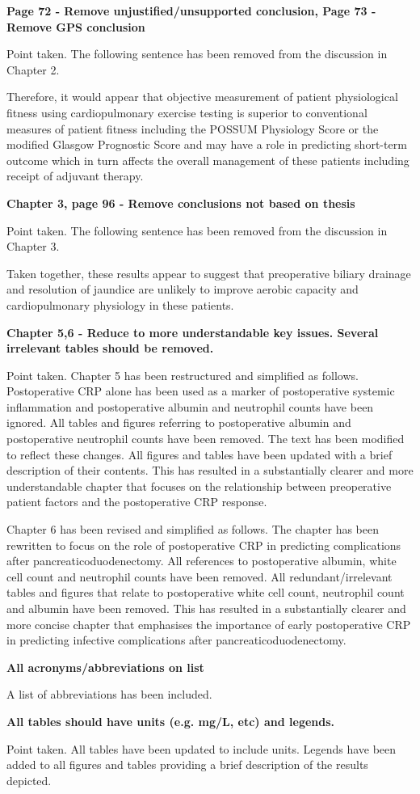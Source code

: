 \documentclass[12pt,a4paper]{article}
\begin{document}
\textbf{Page 72 - Remove unjustified/unsupported conclusion, Page 73 - Remove GPS conclusion}
	
	Point taken. The following sentence has been removed from the discussion in Chapter 2.
	
	Therefore, it would appear that objective measurement of patient physiological fitness using cardiopulmonary exercise testing is superior to conventional measures of patient fitness including the POSSUM Physiology Score or the modified Glasgow Prognostic Score and may have a role in predicting short-term outcome which in turn affects the overall management of these patients including receipt of adjuvant therapy.
	
\textbf{Chapter 3, page 96 - Remove conclusions not based on thesis}
	
	Point taken. The following sentence has been removed from the discussion in Chapter 3.
	
	Taken together, these results appear to suggest that preoperative biliary drainage and resolution of jaundice are unlikely to improve aerobic capacity and cardiopulmonary physiology in these patients.
	
\textbf{Chapter 5,6 - Reduce to more understandable key issues. Several irrelevant tables should be removed.}

	Point taken. 
	Chapter 5 has been restructured and simplified as follows. 
	Postoperative CRP alone has been used as a marker of postoperative systemic inflammation and postoperative albumin and neutrophil counts have been ignored.
	All tables and figures referring to postoperative albumin and postoperative neutrophil counts have been removed. 
	The text has been modified to reflect these changes. 
	All figures and tables have been updated with a brief description of their contents. 
	This has resulted in a substantially clearer and more understandable chapter that focuses on the relationship between preoperative patient factors and the postoperative CRP response.
	
	Chapter 6 has been revised and simplified as follows.
	The chapter has been rewritten to focus on the role of postoperative CRP in predicting complications after pancreaticoduodenectomy.
	All references to postoperative albumin, white cell count and neutrophil counts have been removed.
	All redundant/irrelevant tables and figures that relate to postoperative white cell count, neutrophil count and albumin have been removed.
	This has resulted in a substantially clearer and more concise chapter that emphasises the importance of early postoperative CRP in predicting infective complications after pancreaticoduodenectomy.
	
\textbf{All acronyms/abbreviations on list}
	
	A list of abbreviations has been included.
	
\textbf{All tables should have units (e.g. mg/L, etc) and legends.}
	
	Point taken. 
	All tables have been updated to include units. 
	Legends have been added to all figures and tables providing a brief description of the results
	depicted.
\end{document}
